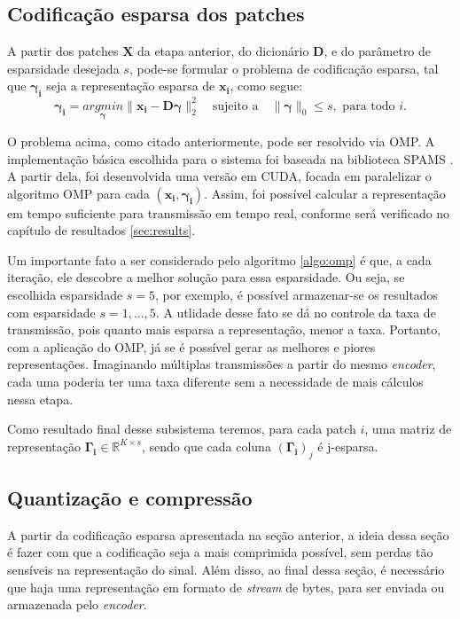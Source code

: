 \documentclass[cic,tc]{iiufrgs}
\renewcommand{\vec}[1]{\bm{#1}}
\newcommand{\mat}[1]{\bm{#1}}
\begin{document}
\subsection{Codificação esparsa dos patches}
A partir dos patches $\mat{X}$ da etapa anterior, do dicionário $\mat{D}$, e do parâmetro 
de esparsidade desejada $s$, pode-se formular o problema de codificação esparsa, tal que 
$\vec{\gamma_i}$ seja a representação esparsa de $\vec{x_i}$, como segue:
\begin{equation}
    \vec{\gamma_i} = \underset{\vec{\gamma}}{argmin} \lVert \vec{x_i} - \mat{D}\vec{\gamma} \rVert_2^2
    \hspace{1em} \text{sujeito a} \hspace{1em}
    \lVert \vec{\gamma} \rVert_0 \le s,
    \text{ para todo } i.
\end{equation}

O problema acima, como citado anteriormente, pode ser resolvido via OMP.
A implementação básica escolhida para o sistema foi baseada na biblioteca SPAMS \cite{SPAMS}.
A partir dela, foi desenvolvida uma versão em CUDA, focada em paralelizar o algoritmo
OMP para cada $(\vec{x_i}, \vec{\gamma_i})$. Assim, foi possível calcular a representação
em tempo suficiente para transmissão em tempo real, conforme será verificado no capítulo 
de resultados \ref{sec:results}.

Um importante fato a ser considerado pelo algoritmo \ref{algo:omp} é que, a cada iteração,
ele descobre a melhor solução para essa esparsidade. Ou seja, se escolhida esparsidade $s=5$,
por exemplo, é possível armazenar-se os resultados com esparsidade $s=1,...,5$. 
A utlidade desse fato se dá no controle da taxa de transmissão, pois quanto mais esparsa a 
representação, menor a taxa. 
Portanto, com a aplicação do OMP, já se é possível gerar as melhores e piores representações.
Imaginando múltiplas transmissões a partir do mesmo \textit{encoder}, cada uma poderia ter 
uma taxa diferente sem a necessidade de mais cálculos nessa etapa.

Como resultado final desse subsistema teremos, para cada patch $i$, uma matriz de representação
$\mat{\Gamma_i} \in \mathbb{R}^{K \times s}$, sendo que cada coluna $(\mat{\Gamma_i})_j$ é 
j-esparsa.

\subsection{Quantização e compressão}
A partir da codificação esparsa apresentada na seção anterior, a ideia dessa seção é 
fazer com que a codificação seja a mais comprimida possível, sem perdas tão sensíveis
na representação do sinal.
Além disso, ao final dessa seção, é necessário que haja uma representação em formato de 
\textit{stream} de bytes, para ser enviada ou armazenada pelo \textit{encoder}.
\end{document}
